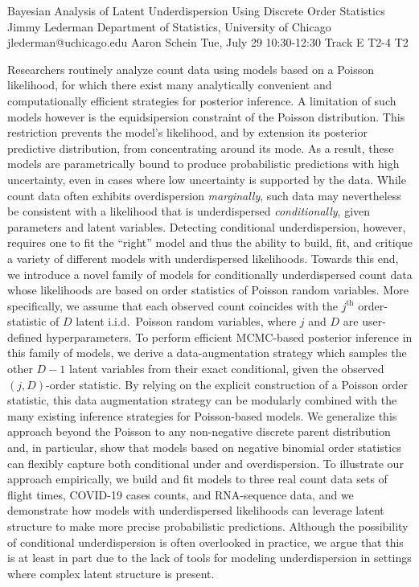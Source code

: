 \begin{talk}
  {Bayesian Analysis of Latent Underdispersion Using Discrete Order Statistics}%
  {Jimmy Lederman}%
  {Department of Statistics, University of Chicago}%
  {jlederman@uchicago.edu}%
  {Aaron Schein}%
  {}%
  {Tue, July 29 10:30-12:30 Track E}%
  {T2-4}%
  {T2}%
  
				


Researchers routinely analyze count data using models based on a Poisson likelihood, for which there exist many analytically convenient and computationally efficient strategies for posterior inference. A limitation of such models however is the equidsipersion constraint of the Poisson distribution. This restriction prevents the model's likelihood, and by extension its posterior predictive distribution, from concentrating around its mode. As a result, these models are parametrically bound to produce probabilistic predictions with high uncertainty, even in cases where low uncertainty is supported by the data. While count data often exhibits overdispersion \textit{marginally}, such data may nevertheless be consistent with a likelihood that is underdispersed \textit{conditionally}, given parameters and latent variables. Detecting conditional underdispersion, however, requires one to fit the ``right'' model and thus the ability to build, fit, and critique a variety of different models with underdispersed likelihoods. Towards this end, we introduce a novel family of models for conditionally underdispersed count data whose likelihoods are based on order statistics of Poisson random variables. More specifically, we assume that each observed count coincides with the $j^{\textrm{th}}$ order-statistic of $D$ latent i.i.d.~Poisson random variables, where $j$ and $D$ are user-defined hyperparameters. To perform efficient MCMC-based posterior inference in this family of models, we derive a data-augmentation strategy which samples the other $D{-}1$ latent variables from their exact conditional, given the observed $(j,D)$-order statistic. By relying on the explicit construction of a Poisson order statistic, this data augmentation strategy can be modularly combined with the many existing inference strategies for Poisson-based models. We generalize this approach beyond the Poisson to any non-negative discrete parent distribution and, in particular, show that models based on negative binomial order statistics can flexibly capture both conditional under and overdispersion.  To illustrate our approach empirically, we build and fit models to three real count data sets of flight times, COVID-19 cases counts, and RNA-sequence data, and we demonstrate how models with underdispersed likelihoods can leverage latent structure to make more precise probabilistic predictions. Although the possibility of conditional underdispersion is often overlooked in practice, we argue that this is at least in part due to the lack of tools for modeling underdispersion in settings where complex latent structure is present.


\end{talk}
